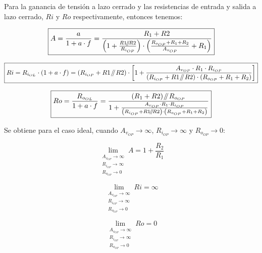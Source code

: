 Para la ganancia de tensión a lazo cerrado y las resistencias de entrada y salida a lazo cerrado, $R{i}$ y $R{o}$ respectivamente, entonces tenemos:


\begin{equation}
\boxed{ A = \frac{a}{1 + a \cdot f} = \frac{R_{1} + R{2}}{ \left( 1 + \frac{R{1} \mathbin{\!/\mkern-5mu/\!} R{2}}{R_{i_{OP}}} \right) \cdot \left( \frac{R_{o_{OP}} + R_{1} + R_{2}}{A_{v_{OP}}} + R_{1} \right) } }
\end{equation}


\begin{equation}
\boxed{ R{i} = R_{i_{OL}} \cdot \left( 1 + a \cdot f \right) = \left(  R_{i_{OP}} + R{1} \mathbin{\!/\mkern-5mu/\!} R{2} \right) \cdot \left[ 1 + \frac{ A_{v_{OP}} \cdot R_{1} \cdot R_{i_{OP}} }{  \left( R_{i_{OP}} + R{1} \mathbin{\!/\mkern-5mu/\!} R{2} \right) \cdot \left( R_{o_{OP}} + R_{1} + R_{2} \right) } \right] }
\end{equation}


\begin{equation}
\boxed{ R{o} = \frac{R_{o_{OL}}}{1 + a \cdot f} = \frac{\left( R_{1} + R{2} \right) \mathbin{\!/\mkern-5mu/\!} R_{o_{OP}}}{1 + \frac{ A_{v_{OP}} \cdot R_{1} \cdot R_{i_{OP}} }{  \left( R_{i_{OP}} + R{1} \mathbin{\!/\mkern-5mu/\!} R{2} \right) \cdot \left( R_{o_{OP}} + R_{1} + R_{2} \right) }} }
\end{equation}


Se obtiene para el caso ideal, cuando $A_{v_{OP}} \longrightarrow \infty$, $R_{i_{OP}} \longrightarrow \infty$ y $R_{o_{OP}} \longrightarrow 0$:

\begin{equation}
\lim_{\substack{A_{v_{OP}} \to \infty \\ R_{i_{OP}} \to \infty \\ R_{o_{OP}} \to 0}} A = 1 + \frac{R_{2}}{R_{1}} 
\end{equation}


\begin{equation}
\lim_{\substack{A_{v_{OP}} \to \infty \\ R_{i_{OP}} \to \infty \\ R_{o_{OP}} \to 0}} R{i} = \infty
\end{equation}


\begin{equation}
\lim_{\substack{A_{v_{OP}} \to \infty \\ R_{i_{OP}} \to \infty \\ R_{o_{OP}} \to 0}} R{o} = 0
\end{equation}


